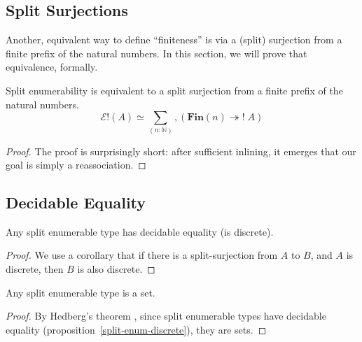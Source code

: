 \subsection{Split Surjections}
Another, equivalent way to define ``finiteness'' is via a (split) surjection
from a finite prefix of the natural numbers.
In this section, we will prove that equivalence, formally.

\begin{rm-theorem} \label{split-enum-surj}
  Split enumerability is equivalent to a split surjection from a finite prefix
  of the natural numbers.
  \begin{equation}
    \mathcal{E}!(A) \simeq \sum_{(n : \mathbb{N})} , \left( \mathbf{Fin}(n) \twoheadrightarrow ! \; A \right)
  \end{equation}
\end{rm-theorem}
\begin{proof}
  The proof is surprisingly short: after sufficient inlining, it emerges that
  our goal is simply a reassociation.
\end{proof}
\subsection{Decidable Equality}
\begin{rm-lemma} \label{split-enum-discrete}
  Any split enumerable type has decidable equality (is discrete).
\end{rm-lemma}
\begin{proof}
  We use a corollary that if there is a split-surjection from \(A\) to \(B\),
  and \(A\) is discrete, then \(B\) is also discrete.
\end{proof}
\begin{rm-lemma}
  Any split enumerable type is a set.
\end{rm-lemma}
\begin{proof}
  By Hedberg's theorem \cite{hedbergCoherenceTheoremMartinLof1998}, since split
  enumerable types have decidable equality
  (proposition~\ref{split-enum-discrete}), they are sets.
\end{proof}
